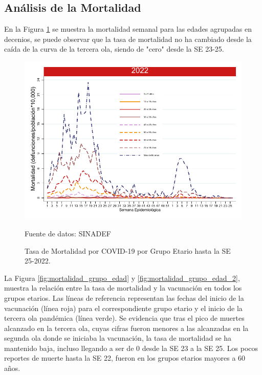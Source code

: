 \documentclass[12pt,a4paper,openany]{book}
\begin{document}
	\subsection*{Análisis de la Mortalidad}
	
	\noindent En la Figura \ref{fig:mortalidad_edad} se muestra la mortalidad semanal para las edades agrupadas en decenios, se puede observar que la tasa de mortalidad no ha cambiado desde la caída de la curva de la tercera ola, siendo de "cero" desde la SE 23-25.
	
	\begin{figure}[h]
		\caption{Tasa de Mortalidad por COVID-19 por Grupo Etario hasta la SE 25-2022.}\label{fig:mortalidad_edad}
		\begin{center}
			\includegraphics[width=0.65\linewidth]{../figuras/mortalidad_edad_2021_2022.pdf}
		\end{center}
		{\footnotesize Fuente de datos: SINADEF} 
	\end{figure}
	
	
	La Figura \ref{fig:mortalidad_grupo_edad} y 
	\ref{fig:mortalidad_grupo_edad_2},
	muestra la relación entre la tasa de mortalidad y la vacunación en todos los grupos etarios. Las líneas de referencia  representan las fechas del inicio de la vacunación (línea roja) para el correspondiente grupo etario y el inicio de la tercera ola pandémica (línea verde). Se evidencia que tras el pico de muertes alcanzado en la tercera ola, cuyas cifras fueron menores a las alcanzadas en la segunda ola donde se iniciaba la vacunación, la tasa de mortalidad se ha mantenido baja,	
	incluso llegando a ser de 0 desde la SE 23 a la SE 25.
	Los pocos reportes de muerte hasta la SE 22, fueron en los grupos etarios mayores a 60 años.
	
\end{document}
